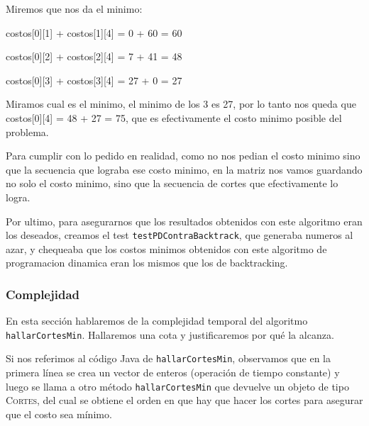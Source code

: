 \documentclass[12pt, a4paper,english,spanish]{article}
\begin{document}
\vspace{0.5cm}

Miremos que nos da el minimo:

\vspace{0.5cm}

costos[0][1] + costos[1][4] = 0 + 60 = 60

\vspace{0.02cm}

costos[0][2] + costos[2][4] = 7 + 41 = 48

\vspace{0.02cm}

costos[0][3] + costos[3][4] = 27 + 0 = 27

\vspace{0.5cm}

Miramos cual es el minimo, el minimo de los 3 es 27, por lo tanto nos queda que costos[0][4] = 48 + 27 = 75, que es efectivamente el costo minimo posible del problema.

\vspace{0.7cm}

Para cumplir con lo pedido en realidad, como no nos pedian el costo minimo sino que la secuencia que lograba ese costo minimo, en la matriz nos vamos guardando no solo el costo minimo, sino que la secuencia de cortes que efectivamente lo logra.

\vspace{0.5cm}

Por ultimo, para asegurarnos que los resultados obtenidos con este algoritmo eran los deseados, creamos el test \texttt{testPDContraBacktrack}, que generaba numeros al azar, y chequeaba que los costos minimos obtenidos con este algoritmo de programacion dinamica eran los mismos que los de backtracking.




\subsubsection*{Complejidad}
En esta secci\'on hablaremos de la complejidad temporal del algoritmo \texttt{hallarCortesMin}. Hallaremos una cota y justificaremos por qu\'e la alcanza.

Si nos referimos al c\'odigo Java de \texttt{hallarCortesMin}, observamos que en la primera l\'inea se crea un vector de enteros (operaci\'on de tiempo constante) y luego se llama a otro m\'etodo \texttt{hallarCortesMin} que devuelve un objeto de tipo \textsc{Cortes}, del cual se obtiene el orden en que hay que hacer los cortes para asegurar que el costo sea m\'inimo. 
\end{document}
